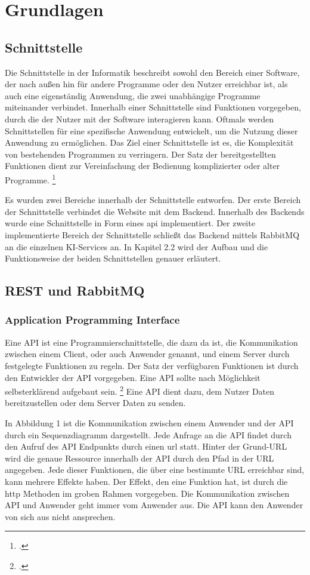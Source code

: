 \section{Grundlagen}
\subsection{Schnittstelle}
Die Schnittstelle in der Informatik beschreibt sowohl den Bereich einer Software, der nach außen hin für andere Programme oder den Nutzer erreichbar ist, als auch eine eigenständig Anwendung, die zwei unabhängige Programme miteinander verbindet. Innerhalb einer Schnittstelle sind Funktionen vorgegeben, durch die der Nutzer mit der Software interagieren kann. Oftmals werden Schnittstellen für eine spezifische Anwendung entwickelt, um die Nutzung dieser Anwendung zu ermöglichen. Das Ziel einer Schnittstelle ist es, die Komplexität von bestehenden Programmen zu verringern. Der Satz der bereitgestellten Funktionen dient zur Vereinfachung der Bedienung komplizierter oder alter Programme. 
\footcite{sneed2006integrating}

Es wurden zwei Bereiche innerhalb der Schnittstelle entworfen. Der erste Bereich der Schnittstelle verbindet die Website mit dem Backend. Innerhalb des Backends wurde eine Schnittstelle in Form eines \ac{api} implementiert. Der zweite implementierte Bereich der Schnittstelle schließt das Backend mittels RabbitMQ an die einzelnen KI-Services an. In Kapitel 2.2 wird der Aufbau und die Funktionsweise der beiden Schnittstellen genauer erläutert.

\subsection{REST und RabbitMQ}
\subsubsection{Application Programming Interface}
Eine API ist eine Programmierschnittstelle, die dazu da ist, die Kommunikation zwischen einem Client, oder auch Anwender genannt, und einem Server durch festgelegte Funktionen zu regeln. Der Satz der verfügbaren Funktionen ist durch den Entwickler der API vorgegeben. Eine API sollte nach Möglichkeit selbsterklärend aufgebaut sein. \footcite{bloch2006design} Eine API dient dazu, dem Nutzer Daten bereitzustellen oder dem Server Daten zu senden.

In Abbildung 1 ist die Kommunikation zwischen einem Anwender und der API durch ein Sequenzdiagramm dargestellt. Jede Anfrage an die API findet durch den Aufruf des API Endpunkts durch einen \ac{url} statt. Hinter der Grund-URL wird die genaue Ressource innerhalb der API durch den Pfad in der URL angegeben. Jede dieser Funktionen, die über eine bestimmte URL erreichbar sind, kann mehrere Effekte haben. Der Effekt, den eine Funktion hat, ist durch die \ac{http} Methoden im groben Rahmen vorgegeben. Die Kommunikation zwischen API und Anwender geht immer vom Anwender aus. Die API kann den Anwender von sich aus nicht ansprechen. 

